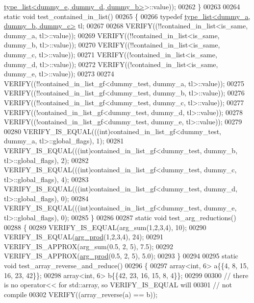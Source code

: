 \begin{DoxyCode}
      \hyperlink{struct_eigen_1_1internal_1_1type__list}{type\_list<dummy\_e, dummy\_d, dummy\_b>}>::value));
00262 \}
00263 
00264 \textcolor{keyword}{static} \textcolor{keywordtype}{void} test\_contained\_in\_list()
00265 \{
00266   \textcolor{keyword}{typedef} \hyperlink{struct_eigen_1_1internal_1_1type__list}{type\_list<dummy\_a, dummy\_b, dummy\_c>} tl;
00267 
00268   VERIFY((!!contained\_in\_list<is\_same, dummy\_a, tl>::value));
00269   VERIFY((!!contained\_in\_list<is\_same, dummy\_b, tl>::value));
00270   VERIFY((!!contained\_in\_list<is\_same, dummy\_c, tl>::value));
00271   VERIFY((!contained\_in\_list<is\_same, dummy\_d, tl>::value));
00272   VERIFY((!contained\_in\_list<is\_same, dummy\_e, tl>::value));
00273 
00274   VERIFY((!!contained\_in\_list\_gf<dummy\_test, dummy\_a, tl>::value));
00275   VERIFY((!!contained\_in\_list\_gf<dummy\_test, dummy\_b, tl>::value));
00276   VERIFY((!!contained\_in\_list\_gf<dummy\_test, dummy\_c, tl>::value));
00277   VERIFY((!contained\_in\_list\_gf<dummy\_test, dummy\_d, tl>::value));
00278   VERIFY((!contained\_in\_list\_gf<dummy\_test, dummy\_e, tl>::value));
00279 
00280   VERIFY\_IS\_EQUAL(((\textcolor{keywordtype}{int})contained\_in\_list\_gf<dummy\_test, dummy\_a, tl>::global\_flags), 1);
00281   VERIFY\_IS\_EQUAL(((\textcolor{keywordtype}{int})contained\_in\_list\_gf<dummy\_test, dummy\_b, tl>::global\_flags), 2);
00282   VERIFY\_IS\_EQUAL(((\textcolor{keywordtype}{int})contained\_in\_list\_gf<dummy\_test, dummy\_c, tl>::global\_flags), 4);
00283   VERIFY\_IS\_EQUAL(((\textcolor{keywordtype}{int})contained\_in\_list\_gf<dummy\_test, dummy\_d, tl>::global\_flags), 0);
00284   VERIFY\_IS\_EQUAL(((\textcolor{keywordtype}{int})contained\_in\_list\_gf<dummy\_test, dummy\_e, tl>::global\_flags), 0);
00285 \}
00286 
00287 \textcolor{keyword}{static} \textcolor{keywordtype}{void} test\_arg\_reductions()
00288 \{
00289   VERIFY\_IS\_EQUAL(arg\_sum(1,2,3,4), 10);
00290   VERIFY\_IS\_EQUAL(\hyperlink{struct_eigen_1_1internal_1_1arg__prod}{arg\_prod}(1,2,3,4), 24);
00291   VERIFY\_IS\_APPROX(arg\_sum(0.5, 2, 5), 7.5);
00292   VERIFY\_IS\_APPROX(\hyperlink{struct_eigen_1_1internal_1_1arg__prod}{arg\_prod}(0.5, 2, 5), 5.0);
00293 \}
00294 
00295 \textcolor{keyword}{static} \textcolor{keywordtype}{void} test\_array\_reverse\_and\_reduce()
00296 \{
00297   array<int, 6> a\{\{4, 8, 15, 16, 23, 42\}\};
00298   array<int, 6> b\{\{42, 23, 16, 15, 8, 4\}\};
00299 
00300   \textcolor{comment}{// there is no operator<< for std::array, so VERIFY\_IS\_EQUAL will}
00301   \textcolor{comment}{// not compile}
00302   VERIFY((array\_reverse(a) == b));

\end{DoxyCode}
